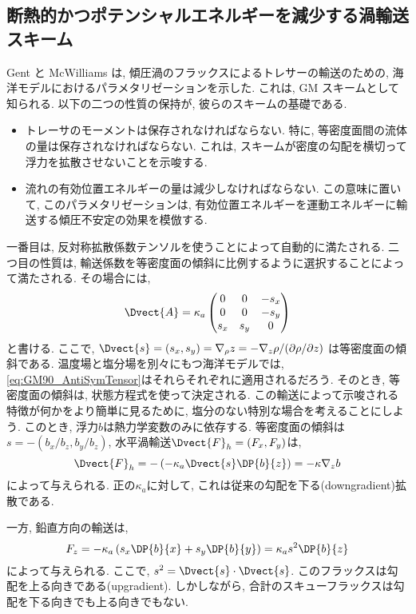 \subsection*{断熱的かつポテンシャルエネルギーを減少する渦輸送スキーム}
Gent と McWilliams は, 傾圧渦のフラックスによるトレサーの輸送のための, 
海洋モデルにおけるパラメタリゼーションを示した. 
これは, GM スキームとして知られる. 
以下の二つの性質の保持が, 彼らのスキームの基礎である. 
\begin{itemize}
 \item トレーサのモーメントは保存されなければならない. 特に, 等密度面間の流体の量は保存されなければならない. これは, スキームが密度の勾配を横切って浮力を拡散させないことを示唆する. 
 \item 流れの有効位置エネルギーの量は減少しなければならない. この意味に置いて, このパラメタリゼーションは, 有効位置エネルギーを運動エネルギーに輸送する傾圧不安定の効果を模倣する. 
\end{itemize}
一番目は, 反対称拡散係数テンソルを使うことによって自動的に満たされる. 
二つ目の性質は, 輸送係数を等密度面の傾斜に比例するように選択することによって満たされる. 
その場合には, 
\begin{equation}
  \Dvect{A} = \kappa_a
\begin{pmatrix}
 0 &0 &-s_x \\
 0 &0 &-s_y \\
 s_x &s_y &0
\end{pmatrix}
\label{eq:GM90_AntiSymTensor}
\end{equation}
と書ける. 
ここで, $\Dvect{s}=(s_x, s_y)=\nabla_\rho z=- \nabla_z \rho/(\partial \rho/\partial z)$
は等密度面の傾斜である. 
温度場と塩分場を別々にもつ海洋モデルでは, \eqref{eq:GM90_AntiSymTensor}はそれらそれぞれに適用されるだろう. 
そのとき, 等密度面の傾斜は, 状態方程式を使って決定される. 
この輸送によって示唆される特徴が何かをより簡単に見るために, 塩分のない特別な場合を考えることにしよう. 
このとき, 浮力$b$は熱力学変数のみに依存する. 
等密度面の傾斜は$s=-(b_x/b_z, b_y/b_z)$, 水平渦輸送$\Dvect{F}_h=(F_x, F_y)$は, 
\begin{equation}
 \Dvect{F}_h = -\left(-\kappa_a \Dvect{s} \DP{b}{z} \right)
             = - \kappa \nabla_z b
\end{equation}
によって与えられる. 
正の$\kappa_a$に対して, これは従来の勾配を下る(downgradient)拡散である. 

一方, 鉛直方向の輸送は, 
\begin{equation}
  F_z = - \kappa_a \left(s_x\DP{b}{x} + s_y\DP{b}{y}\right)
      = \kappa_a s^2 \DP{b}{z} 
\end{equation}
によって与えられる. 
ここで, $s^2=\Dvect{s}\cdot\Dvect{s}$. 
このフラックスは勾配を上る向きである(upgradient). 
しかしながら, 合計のスキューフラックスは勾配を下る向きでも上る向きでもない. 

